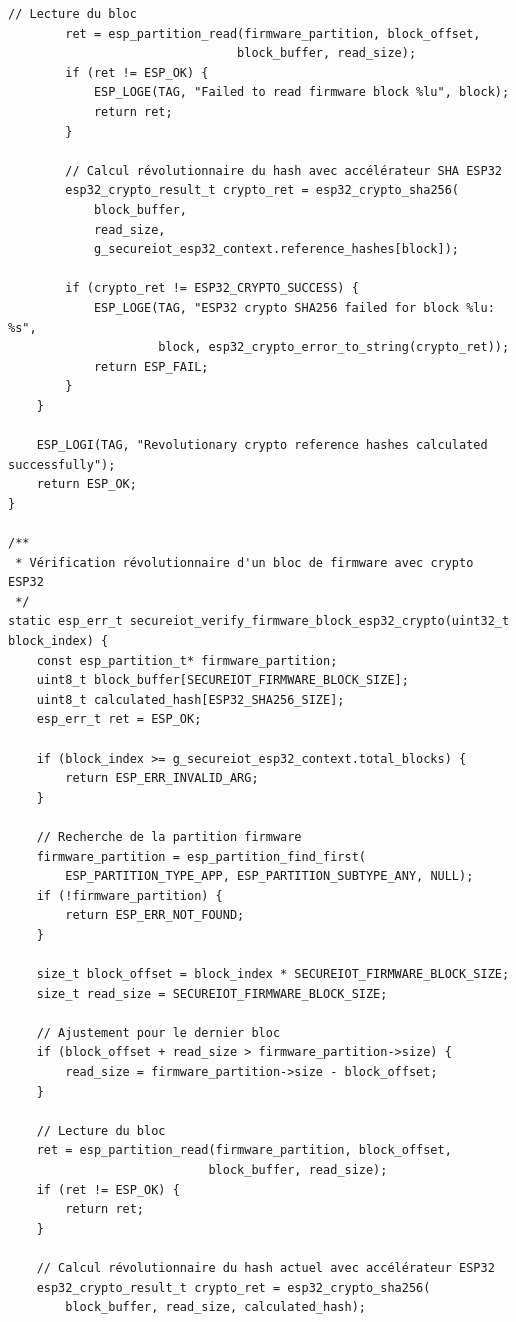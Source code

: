 \begin{lstlisting}[caption={Implémentation révolutionnaire complète du module de vérification d'intégrité ESP32 crypto intégré}]
        // Lecture du bloc
        ret = esp_partition_read(firmware_partition, block_offset, 
                                block_buffer, read_size);
        if (ret != ESP_OK) {
            ESP_LOGE(TAG, "Failed to read firmware block %lu", block);
            return ret;
        }
        
        // Calcul révolutionnaire du hash avec accélérateur SHA ESP32
        esp32_crypto_result_t crypto_ret = esp32_crypto_sha256(
            block_buffer, 
            read_size, 
            g_secureiot_esp32_context.reference_hashes[block]);
        
        if (crypto_ret != ESP32_CRYPTO_SUCCESS) {
            ESP_LOGE(TAG, "ESP32 crypto SHA256 failed for block %lu: %s", 
                     block, esp32_crypto_error_to_string(crypto_ret));
            return ESP_FAIL;
        }
    }
    
    ESP_LOGI(TAG, "Revolutionary crypto reference hashes calculated successfully");
    return ESP_OK;
}

/**
 * Vérification révolutionnaire d'un bloc de firmware avec crypto ESP32
 */
static esp_err_t secureiot_verify_firmware_block_esp32_crypto(uint32_t block_index) {
    const esp_partition_t* firmware_partition;
    uint8_t block_buffer[SECUREIOT_FIRMWARE_BLOCK_SIZE];
    uint8_t calculated_hash[ESP32_SHA256_SIZE];
    esp_err_t ret = ESP_OK;
    
    if (block_index >= g_secureiot_esp32_context.total_blocks) {
        return ESP_ERR_INVALID_ARG;
    }
    
    // Recherche de la partition firmware
    firmware_partition = esp_partition_find_first(
        ESP_PARTITION_TYPE_APP, ESP_PARTITION_SUBTYPE_ANY, NULL);
    if (!firmware_partition) {
        return ESP_ERR_NOT_FOUND;
    }
    
    size_t block_offset = block_index * SECUREIOT_FIRMWARE_BLOCK_SIZE;
    size_t read_size = SECUREIOT_FIRMWARE_BLOCK_SIZE;
    
    // Ajustement pour le dernier bloc
    if (block_offset + read_size > firmware_partition->size) {
        read_size = firmware_partition->size - block_offset;
    }
    
    // Lecture du bloc
    ret = esp_partition_read(firmware_partition, block_offset, 
                            block_buffer, read_size);
    if (ret != ESP_OK) {
        return ret;
    }
    
    // Calcul révolutionnaire du hash actuel avec accélérateur ESP32
    esp32_crypto_result_t crypto_ret = esp32_crypto_sha256(
        block_buffer, read_size, calculated_hash);
    

\end{lstlisting}

